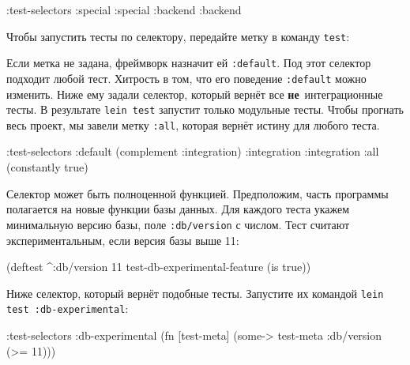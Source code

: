 \begin{english}
  \begin{clojure}
:test-selectors {:special :special
                 :backend :backend}
  \end{clojure}
\end{english}

\noindent
Чтобы запустить тесты по селектору, передайте метку в команду \verb|test|:

\begin{english}
\end{english}


Если метка не задана, фреймворк назначит ей \verb|:default|. Под этот селектор
подходит любой тест. Хитрость в том, что его поведение \verb|:default| можно
изменить. Ниже ему задали селектор, который вернёт все
\textbf{не}~интеграционные тесты. В результате \verb|lein test| запустит только
модульные тесты. Чтобы прогнать весь проект, мы завели метку \verb|:all|,
которая вернёт истину для любого теста.

\begin{english}
  \begin{clojure}
:test-selectors {:default (complement :integration)
                 :integration :integration
                 :all (constantly true)}
  \end{clojure}
\end{english}

Селектор может быть полноценной функцией. Предположим, часть программы
полагается на новые функции базы данных. Для каждого теста укажем минимальную
версию базы, поле \verb|:db/version| с числом. Тест считают экспериментальным,
если версия базы выше 11:

\begin{english}
  \begin{clojure}
(deftest ^{:db/version 11}
  test-db-experimental-feature
  (is true))
  \end{clojure}
\end{english}

\noindent
Ниже селектор, который вернёт подобные тесты. Запустите их командой
\verb|lein test :db-experimental|:

\begin{english}
  \begin{clojure}
:test-selectors {:db-experimental
                 (fn [test-meta]
                   (some-> test-meta :db/version (>= 11)))}
  \end{clojure}
\end{english}

